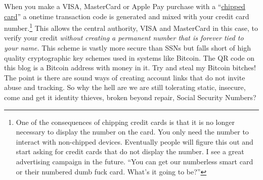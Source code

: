 When you make a VISA, MasterCard or Apple Pay purchase with a
``\href{http://www.creditcards.com/credit-card-news/emv-faq-chip-cards-answers-1264.php}{chipped
card}'' a onetime transaction code is generated and mixed with your
credit card number.\footnote{One of the consequences of chipping credit cards is that it is no
  longer necessary to display the number on the card. You only need the
  number to interact with non-chipped devices. Eventually people will
  figure this out and start asking for credit cards that do not display
  the number. I see a great advertising campaign in the future. ``You
  can get our numberless smart card or their numbered dumb fuck card.
  What's it going to be?''
} This allows the
central authority, VISA and MasterCard in this case, to verify your
credit \emph{without creating a permanent number that is forever tied to
your name.} This scheme is vastly more secure than SSNs but falls short
of high quality cryptographic key schemes used in systems like Bitcoin.
The QR code on this blog is a Bitcoin address with money in it. Try and
steal my Bitcoin bitches! The point is there are sound ways of creating
account links that do not invite abuse and tracking. So why the hell are
we are still tolerating static, insecure, come and get it identity
thieves, broken beyond repair, Social Security Numbers?





%